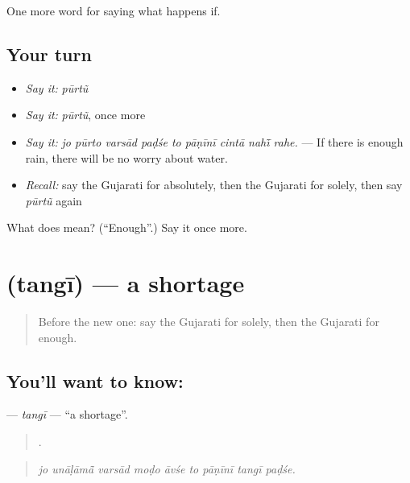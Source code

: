 \begin{grammarlens}[title={What you've built}]
One more word for saying what happens if.
\end{grammarlens}

\subsection*{Your turn}
\begin{itemize}
\raggedright
  \item \emph{Say it:} \emph{pūrtũ}
  \item \emph{Say it:} \emph{pūrtũ}, once more
  \item \emph{Say it:} \emph{jo pūrto varsād paḍśe to pāṇīnī cintā nahī̃ rahe.} — If there is enough rain, there will be no worry about water.
  \item \emph{Recall:} say the Gujarati for absolutely, then the Gujarati for solely, then say \emph{pūrtũ} again
\end{itemize}

\begin{tcolorbox}[breakable,colback=teal!4,colframe=teal!35!black,title={Before you move on}]
What does  mean? (\textquotedblleft{}Enough\textquotedblright{}.) Say it once more.
\end{tcolorbox}
\section[\texorpdfstring{\gu{તંગી} (tangī)}{તંગી (tangī)}]{ (tangī) — a shortage}

\label{lesson:GU-C380-tangi}



\begin{quote}
Before the new one: say the Gujarati for solely, then the Gujarati for enough.
\end{quote}

\subsection*{You'll want to know: }
\textbf{} — \emph{tangī} — \textquotedblleft{}a shortage\textquotedblright{}.

\begin{quote}
        .
\end{quote}

\begin{quote}
\emph{jo unāḷāmā̃ varsād moḍo āvśe to pāṇīnī tangī paḍśe.}
\end{quote}

